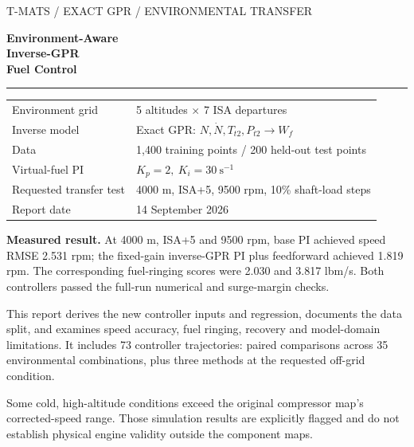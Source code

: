 \documentclass[11pt,a4paper]{article}
\begin{document}
\begin{titlepage}
\color{navy}\sffamily
{\small T-MATS / EXACT GPR / ENVIRONMENTAL TRANSFER}\par\vspace{18mm}
{\fontsize{29}{35}\selectfont\bfseries Environment-Aware\\Inverse-GPR\\Fuel Control\par}
\vspace{9mm}{\Large Altitude and ISA extension, fixed PI gains,\\and disturbance-response comparison\par}
\vspace{10mm}\color{teal}\rule{\linewidth}{1.2pt}\color{navy}\vspace{8mm}
\begin{tabular}{@{}ll}
Environment grid & 5 altitudes $\times$ 7 ISA departures\\[5pt]
Inverse model & Exact GPR: $N,\dot N,T_{t2},P_{t2}\rightarrow W_f$\\[5pt]
Data & 1,400 training points / 200 held-out test points\\[5pt]
Virtual-fuel PI & $K_p=2,\ K_i=30\ \mathrm{s}^{-1}$\\[5pt]
Requested transfer test & 4000 m, ISA+5, 9500 rpm, 10\% shaft-load steps\\[5pt]
Report date & 14 September 2026
\end{tabular}
\par\vspace{10mm}\normalfont\color{ink}
\textbf{Measured result.} At 4000 m, ISA+5 and 9500 rpm, base PI achieved speed RMSE 2.531 rpm; the fixed-gain inverse-GPR PI plus feedforward achieved 1.819 rpm. The corresponding fuel-ringing scores were 2.030 and 3.817 lbm/s. Both controllers passed the full-run numerical and surge-margin checks.

This report derives the new controller inputs and regression, documents the data split, and examines speed accuracy, fuel ringing, recovery and model-domain limitations. It includes 73 controller trajectories: paired comparisons across 35 environmental combinations, plus three methods at the requested off-grid condition.

\vfill Some cold, high-altitude conditions exceed the original compressor map's corrected-speed range. Those simulation results are explicitly flagged and do not establish physical engine validity outside the component maps.
\end{titlepage}
\tableofcontents\clearpage
\end{document}
